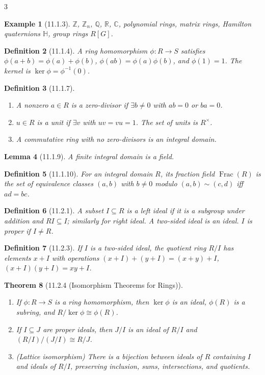 \documentclass[10pt,landscape]{article}
\newtheorem{theorem}{Theorem}[section]
\newtheorem{definition}[theorem]{Definition}
\newtheorem{lemma}[theorem]{Lemma}
\newtheorem{example}[theorem]{Example}
\begin{document}
\begin{multicols}{3}
\begin{example}[11.1.3]
$\mathbb{Z}$, $\mathbb{Z}_n$, $\mathbb{Q}$, $\mathbb{R}$, $\mathbb{C}$, polynomial rings, matrix rings, Hamilton quaternions $\mathbb{H}$, group rings $R[G]$.
\end{example}

\begin{definition}[11.1.4]
A ring homomorphism $\phi: R\to S$ satisfies $\phi(a+b)=\phi(a)+\phi(b)$, $\phi(ab)=\phi(a)\phi(b)$, and $\phi(1)=1$. The kernel is $\ker\phi = \phi^{-1}(0)$.
\end{definition}

\begin{definition}[11.1.7]
\begin{enumerate}
\item A nonzero $a\in R$ is a zero-divisor if $\exists b\neq0$ with $ab=0$ or $ba=0$.
\item $u\in R$ is a unit if $\exists v$ with $uv=vu=1$. The set of units is $R^\times$.
\item A commutative ring with no zero-divisors is an integral domain.
\end{enumerate}
\end{definition}

\begin{lemma}[11.1.9]
A finite integral domain is a field.
\end{lemma}

\begin{definition}[11.1.10]
For an integral domain $R$, its fraction field $\operatorname{Frac}(R)$ is the set of equivalence classes $(a,b)$ with $b\neq0$ modulo $(a,b)\sim(c,d)$ iff $ad=bc$.
\end{definition}

\begin{definition}[11.2.1]
A subset $I\subseteq R$ is a left ideal if it is a subgroup under addition and $RI\subseteq I$; similarly for right ideal. A two-sided ideal is an ideal. $I$ is proper if $I\neq R$.
\end{definition}

\begin{definition}[11.2.3]
If $I$ is a two-sided ideal, the quotient ring $R/I$ has elements $x+I$ with operations $(x+I)+(y+I)=(x+y)+I$, $(x+I)(y+I)=xy+I$.
\end{definition}

\begin{theorem}[11.2.4 (Isomorphism Theorems for Rings)]
\begin{enumerate}
\item If $\phi:R\to S$ is a ring homomorphism, then $\ker\phi$ is an ideal, $\phi(R)$ is a subring, and $R/\ker\phi \cong \phi(R)$.
\item If $I\subseteq J$ are proper ideals, then $J/I$ is an ideal of $R/I$ and $(R/I)/(J/I)\cong R/J$.
\item (Lattice isomorphism) There is a bijection between ideals of $R$ containing $I$ and ideals of $R/I$, preserving inclusion, sums, intersections, and quotients.
\end{enumerate}
\end{theorem}


\end{multicols}
\end{document}
